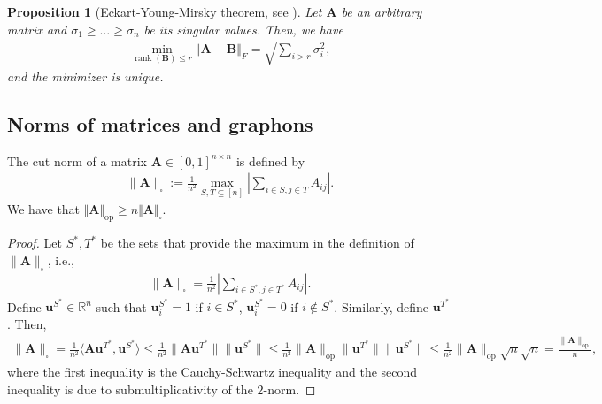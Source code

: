 \documentclass[11pt]{article}
\newcommand{\bbR}{\mathbb{R}}
\newcommand{\op}{\mathrm{op}}
\newcommand{\bA}{\bm{A}}
\newcommand{\bB}{\bm{B}}
\newcommand{\bu}{\bm{u}}
\newcommand{\bbW}{\mathbb{W}}
\newcommand{\<}{\langle}
\renewcommand{\>}{\rangle}
\DeclareMathOperator{\rank}{rank}
\theoremstyle{plain}
\newtheorem{prop}{Proposition}
\theoremstyle{definition}
\theoremstyle{remark}
\begin{document}
{\begin{prop}[Eckart-Young-Mirsky theorem, see \citep{bisgard2020}]
\label{proposition: eckart-yang theorem}
	Let $\bA$ be an arbitrary matrix and $\sigma_1 \ge \ldots \ge \sigma_n$ be its singular values. Then, we have
	\begin{align*}
		\min_{\rank(\bB) \le r} \Vert \bA - \bB \Vert_{F} = \sqrt{\sum_{i > r} \sigma_i^2},
	\end{align*}
	and the minimizer is unique.
\end{prop}


\subsection{Norms of matrices and graphons}
The cut norm of a matrix $\bA \in [0,1]^{n \times n}$ is defined by
\begin{align}
    \|\bA\|_\square := \frac{1}{n^2} \max_{S, T \subseteq [n]} \left|\sum_{i \in S, j \in T} A_{ij}\right|. 
\end{align} 
We have that  $\Vert \bA \Vert_{\op} \ge n \Vert \bA \Vert_{\square}.$
\begin{proof}
    Let $S^*, T^*$ be the sets that provide the maximum  in  the definition of $\|\bA\|_\square$, i.e., 
    \begin{align*}
        \|\bA\|_\square = \frac{1}{n^2} \left|\sum_{i \in S^*, j \in T^*} A_{ij}\right|.
    \end{align*}
    Define $\bu^{S^*} \in \bbR^n$ such that $\bu^{S^*}_i = 1$ if $i \in S^*$, $\bu^{S^*}_i = 0$ if $i \notin S^*$.  Similarly, define $\bu^{T^*}$. Then,
    \begin{align*}
        \|\bA\|_\square = \frac{1}{n^2} \langle \bA \bu^{T^*}, \bu^{S^*} \rangle \leq \frac{1}{n^2} \| \bA \bu^{T^*} \| \| \bu^{S^*} \| \leq \frac{1}{n^2} \| \bA \|_{\op} \| \bu^{T^*} \| \| \bu^{S^*} \| \leq \frac{1}{n^2} \| \bA \|_{\op} \sqrt{n} \sqrt{n} = \frac{\|\bA\|_{\op}}{n},  
    \end{align*}
    where the first inequality is the Cauchy-Schwartz inequality and the second inequality is due to submultiplicativity of the $2$-norm. 
\end{proof}
}
\end{document}
